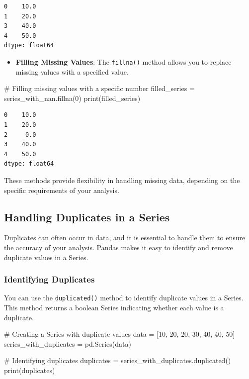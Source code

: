 \documentclass[
  letterpaper,
  DIV=11,
  numbers=noendperiod]{scrreprt}
\newenvironment{Shaded}{\begin{snugshade}}{\end{snugshade}}
\newcommand{\BuiltInTok}[1]{\textcolor[rgb]{0.00,0.23,0.31}{#1}}
\newcommand{\CommentTok}[1]{\textcolor[rgb]{0.37,0.37,0.37}{#1}}
\newcommand{\DecValTok}[1]{\textcolor[rgb]{0.68,0.00,0.00}{#1}}
\newcommand{\NormalTok}[1]{\textcolor[rgb]{0.00,0.23,0.31}{#1}}
\newcommand{\OperatorTok}[1]{\textcolor[rgb]{0.37,0.37,0.37}{#1}}
\providecommand{\tightlist}{%
  \setlength{\itemsep}{0pt}\setlength{\parskip}{0pt}}\usepackage{longtable,booktabs,array}
\begin{document}
\begin{verbatim}
0    10.0
1    20.0
3    40.0
4    50.0
dtype: float64
\end{verbatim}

\begin{itemize}
\tightlist
\item
  \textbf{Filling Missing Values}: The \texttt{fillna()} method allows
  you to replace missing values with a specified value.
\end{itemize}

\begin{Shaded}
\begin{Highlighting}[]
\CommentTok{\# Filling missing values with a specific number}
\NormalTok{filled\_series }\OperatorTok{=}\NormalTok{ series\_with\_nan.fillna(}\DecValTok{0}\NormalTok{)}
\BuiltInTok{print}\NormalTok{(filled\_series)}
\end{Highlighting}
\end{Shaded}

\begin{verbatim}
0    10.0
1    20.0
2     0.0
3    40.0
4    50.0
dtype: float64
\end{verbatim}

These methods provide flexibility in handling missing data, depending on
the specific requirements of your analysis.

\hypertarget{handling-duplicates-in-a-series}{%
\subsection{Handling Duplicates in a
Series}\label{handling-duplicates-in-a-series}}

Duplicates can often occur in data, and it is essential to handle them
to ensure the accuracy of your analysis. Pandas makes it easy to
identify and remove duplicate values in a Series.

\hypertarget{identifying-duplicates}{%
\subsubsection{Identifying Duplicates}\label{identifying-duplicates}}

You can use the \texttt{duplicated()} method to identify duplicate
values in a Series. This method returns a boolean Series indicating
whether each value is a duplicate.

\begin{Shaded}
\begin{Highlighting}[]
\CommentTok{\# Creating a Series with duplicate values}
\NormalTok{data }\OperatorTok{=}\NormalTok{ [}\DecValTok{10}\NormalTok{, }\DecValTok{20}\NormalTok{, }\DecValTok{20}\NormalTok{, }\DecValTok{30}\NormalTok{, }\DecValTok{40}\NormalTok{, }\DecValTok{40}\NormalTok{, }\DecValTok{50}\NormalTok{]}
\NormalTok{series\_with\_duplicates }\OperatorTok{=}\NormalTok{ pd.Series(data)}

\CommentTok{\# Identifying duplicates}
\NormalTok{duplicates }\OperatorTok{=}\NormalTok{ series\_with\_duplicates.duplicated()}
\BuiltInTok{print}\NormalTok{(duplicates)}
\end{Highlighting}
\end{Shaded}
\end{document}
